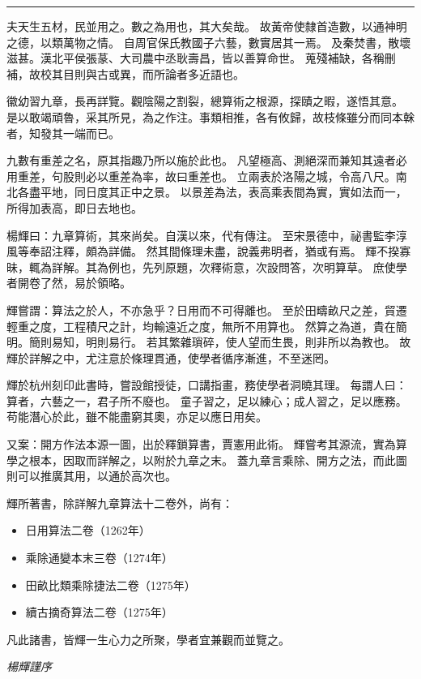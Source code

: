 \documentclass[11pt,a4paper]{article}
\begin{document}
\begin{center}
\rule{0.5\textwidth}{0.4pt}
\end{center}

夫天生五材，民並用之。數之為用也，其大矣哉。
故黃帝使隸首造數，以通神明之德，以類萬物之情。
自周官保氏教國子六藝，數實居其一焉。
及秦焚書，散壞滋甚。漢北平侯張蒃、大司農中丞耿壽昌，皆以善算命世。
蒐殘補缺，各稱刪補，故校其目則與古或異，而所論者多近語也。

徽幼習九章，長再詳覽。觀陰陽之割裂，總算術之根源，探賾之暇，遂悟其意。
是以敢竭頑魯，采其所見，為之作注。事類相推，各有攸歸，故枝條雖分而同本榦者，知發其一端而已。

九數有重差之名，原其指趣乃所以施於此也。
凡望極高、測絕深而兼知其遠者必用重差，句股則必以重差為率，故曰重差也。
立兩表於洛陽之城，令高八尺。南北各盡平地，同日度其正中之景。
以景差為法，表高乘表間為實，實如法而一，所得加表高，即日去地也。

楊輝曰：九章算術，其來尚矣。自漢以來，代有傳注。
至宋景德中，祕書監李淳風等奉詔注釋，頗為詳備。
然其間條理未盡，說義弗明者，猶或有焉。
輝不揆寡昧，輒為詳解。其為例也，先列原題，次釋術意，次設問答，次明算草。
庶使學者開卷了然，易於領略。

輝嘗謂：算法之於人，不亦急乎？日用而不可得離也。
至於田疇畝尺之差，貿遷輕重之度，工程積尺之計，均輸遠近之度，無所不用算也。
然算之為道，貴在簡明。簡則易知，明則易行。
若其繁雜瑣碎，使人望而生畏，則非所以為教也。
故輝於詳解之中，尤注意於條理貫通，使學者循序漸進，不至迷罔。

輝於杭州刻印此書時，嘗設館授徒，口講指畫，務使學者洞曉其理。
每謂人曰：算者，六藝之一，君子所不廢也。
童子習之，足以練心；成人習之，足以應務。
苟能潛心於此，雖不能盡窮其奧，亦足以應日用矣。

又案：開方作法本源一圖，出於釋鎖算書，賈憲用此術。
輝嘗考其源流，實為算學之根本，因取而詳解之，以附於九章之末。
蓋九章言乘除、開方之法，而此圖則可以推廣其用，以通於高次也。

輝所著書，除詳解九章算法十二卷外，尚有：
\begin{itemize}[leftmargin=2em]
\item 日用算法二卷（1262年）
\item 乘除通變本末三卷（1274年）
\item 田畝比類乘除捷法二卷（1275年）
\item 續古摘奇算法二卷（1275年）
\end{itemize}

凡此諸書，皆輝一生心力之所聚，學者宜兼觀而並覽之。

\begin{flushright}
\textit{楊輝謹序}
\end{flushright}
\end{document}
